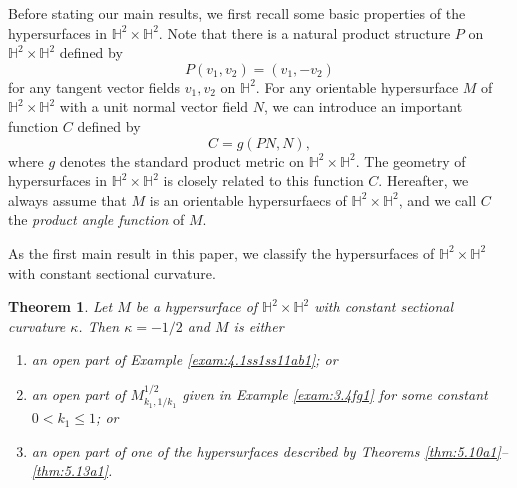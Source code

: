 \documentclass[reqno]{amsart}%
\newtheorem{theorem}{Theorem}[section]   %
\theoremstyle{definition}
\numberwithin{equation}{section}
\begin{document}
Before stating our main results, we first recall some basic properties of the hypersurfaces in $\mathbb{H}^2\times\mathbb{H}^2$. Note that there is a natural  product
structure $P$ on $\mathbb{H}^2\times\mathbb{H}^2$ defined by $$P(v_1,v_2)=(v_1,-v_2)$$ for
any tangent vector fields $v_1, v_2$ on $\mathbb{H}^2$. 
For any orientable hypersurface $M$ of $\mathbb{H}^2\times\mathbb{H}^2$ with
a unit normal vector field $N$,  we can introduce an important function $C$ defined by
$$C=g(PN, N),$$ 
where $g$ denotes the standard product metric
on $\mathbb{H}^2\times\mathbb{H}^2$. %
The geometry of hypersurfaces in $\mathbb{H}^2\times\mathbb{H}^2$ is closely related
to this function $C$. Hereafter, we always assume that $M$ is an orientable hypersurfaecs of $\mathbb{H}^2\times\mathbb{H}^2$, and we call $C$ the
{\it product angle function} of $M$.

As the first main result in this paper, we classify  the hypersurfaces of $\mathbb{H}^2\times\mathbb{H}^2$ with constant sectional curvature.
\begin{theorem}\label{thm:1.1}
Let $M$ be a hypersurface of $\mathbb{H}^2\times \mathbb{H}^2$ with constant sectional curvature $\kappa$.
Then $\kappa=-1/2$ and $M$ is either
\begin{enumerate}
\item[(1)]
an open part of Example \ref{exam:4.1ss1ss11ab1}; or

\item[(2)]
an open part of $M_{k_1,1/k_1}^{1/2}$ given in Example \ref{exam:3.4fg1} for some constant $0<k_1\leq1$; or

\item[(3)]
an open part of one of the hypersurfaces described by Theorems \ref{thm:5.10a1}--\ref{thm:5.13a1}.

\end{enumerate}
\end{theorem}
\end{document}

